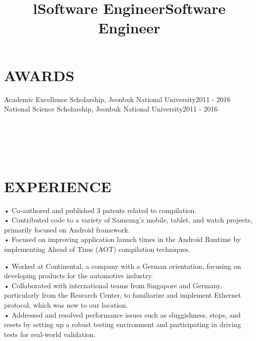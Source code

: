 \documentclass[margin]{res}
\begin{document}
\begin{resume}
\section{AWARDS}
Academic Excellence Scholarship, Jeonbuk National University\hfill 2011 - 2016\\
National Science Scholarship, Jeonbuk National University\hfill 2011 - 2016

\begin{format}
    \\
    \title{l}\\
    \body\\
    \end{format}

    \section{EXPERIENCE}
    \title{Software Engineer}
    \begin{position}
        • Co-authored and published 3 patents related to compilation.
        \\• Contributed code to a variety of Samsung’s mobile, tablet, and watch projects, primarily focused on Android framework.
        \\• Focused on improving application launch times in the Android Runtime by implementing Ahead of Time (AOT) compilation techniques.
    \end{position}

    \title{Software Engineer}
    \begin{position}
        • Worked at Continental, a company with a German orientation, focusing on developing products for the automotive industry.
        \\• Collaborated with international teams from Singapore and Germany, particularly from the Research Center, to familiarize and implement
        Ethernet protocol, which was new to our location.
        \\• Addressed and resolved performance issues such as sluggishness, stops, and resets by setting up a robust testing environment and
        participating in driving tests for real-world validation.
    \end{position}


\end{resume}
\end{document}
